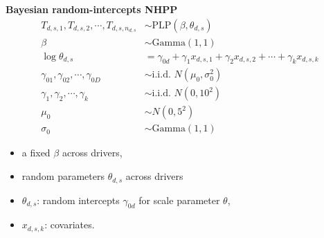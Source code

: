 \documentclass[aspectratio=43]{beamer}
\begin{document}
\begin{frame}{\textbf{Bayesian random-intercepts NHPP}}
\begin{equation}\label{eq:nhpp}
\begin{aligned}
T_{d, s, 1}, T_{d, s, 2}, \cdots , T_{d, s, n_{d, s}} & \sim \text{PLP}(\beta, \theta_{d, s})\\
\beta & \sim \text{Gamma}(1, 1)\\
\log\theta_{d, s} &= \gamma_{0d} + \gamma_{1}x_{d, s, 1} + \gamma_{2}x_{d, s, 2} + \cdots + \gamma_{k}x_{d, s, k}\\
\gamma_{01}, \gamma_{02}, \cdots, \gamma_{0D} & \sim \text{i.i.d. }N(\mu_0, \sigma_0^2)\\
\gamma_1, \gamma_2, \cdots, \gamma_k & \sim \text{i.i.d. }N(0, 10^2)\\
\mu_0 &\sim N(0, 5^2) \\
\sigma_0 &\sim \text{Gamma}(1, 1)
\end{aligned}
\end{equation}
\begin{itemize}
    \item a fixed $\beta$ across drivers, 
    \item random parameters $\theta_{d, s}$ across drivers
    \item $\theta_{d, s}$: random intercepts $\gamma_{0d}$ for scale parameter $\theta$,
    \item $x_{d, s, k}$: covariates.
\end{itemize}
\end{frame}
\end{document}
